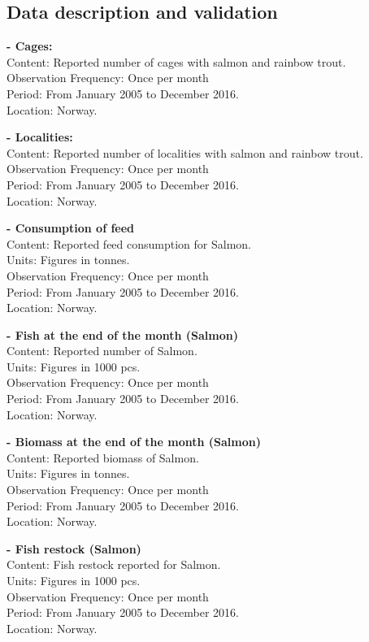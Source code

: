\newpage
\subsection{Data description and validation}
\textbf{- Cages:}
	\\ Content: Reported number of cages with salmon and rainbow trout.
	\\ Observation Frequency: Once per month
	\\ Period:  From January 2005 to December 2016.
	\\ Location: Norway.

\textbf{- Localities:}
	\\ Content: Reported number of localities with salmon and rainbow trout. 
	\\ Observation Frequency: Once per month
	\\ Period:  From January 2005 to December 2016.
	\\ Location: Norway.


\textbf{- Consumption of feed}
	\\ Content: Reported feed consumption for Salmon.
	\\ Units: Figures in tonnes.
	\\ Observation Frequency: Once per month
	\\ Period:  From January 2005 to December 2016.
	\\ Location: Norway.


\textbf{- Fish at the end of the month (Salmon)}
	\\ Content: Reported number of Salmon. 
	\\ Units: Figures in 1000 pcs.
	\\ Observation Frequency: Once per month
	\\ Period:  From January 2005 to December 2016.
	\\ Location: Norway.

\textbf{- Biomass at the end of the month (Salmon)}
	\\ Content: Reported biomass of Salmon. 
	\\ Units: Figures in tonnes.
	\\ Observation Frequency: Once per month
	\\ Period:  From January 2005 to December 2016.
	\\ Location: Norway.
	
\textbf{- Fish restock (Salmon)}
	\\ Content: Fish restock reported for Salmon.
	\\ Units: Figures in 1000 pcs.
	\\ Observation Frequency: Once per month
	\\ Period:  From January 2005 to December 2016.
	\\ Location: Norway.


